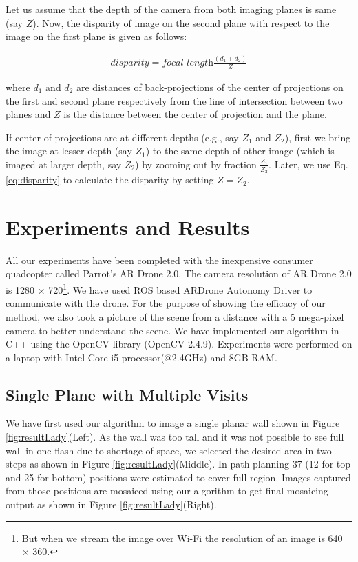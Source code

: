 Let us assume that the depth of the camera from both imaging planes is same
(say $Z$). Now, the disparity of image on the second plane with respect to the
image on the first plane is given as follows\cite{Prasad16}:
\begin{ceqn}
\begin{align}
\textit{disparity} = \textit{focal length}\frac{(d_1+d_2)}{Z}
\label{eq:disparity}
\end{align}
\end{ceqn}

where $d_1$ and $d_2$ are distances of back-projections of the center of
projections on the first and second plane respectively from the line of
intersection between two planes and $Z$ is the distance between the center of
projection and the plane.

If center of projections are at different depths (e.g., say $Z_1$ and
$Z_2$), first we bring the image at lesser depth (say $Z_1$) to the same depth
of other image (which is imaged at larger depth, say $Z_2$) by zooming out by
fraction $\frac{Z_1}{Z_2}$. Later, we use Eq. \ref{eq:disparity} to calculate
the disparity by setting $Z=Z_2$.

\section{Experiments and Results}
All our experiments have been completed with the inexpensive consumer
quadcopter called  Parrot’s AR Drone 2.0. The camera resolution of AR Drone 2.0
is 1280 $\times$ 720\footnote{But when we stream the image over Wi-Fi the resolution
of an image is 640 $\times$ 360.}. We have used ROS based ARDrone Autonomy
Driver to communicate with the drone. For the purpose of showing the efficacy
of our method, we also took a picture of the scene from a distance with a 5
mega-pixel camera to better understand the scene. We have implemented our
algorithm in C++ using the OpenCV library (OpenCV 2.4.9).  Experiments were
performed on a laptop with Intel Core i5 processor(@2.4GHz) and 8GB RAM.

\subsection{Single Plane with Multiple Visits}
We have first used our algorithm to image a single planar wall shown in
Figure \ref{fig:resultLady}(Left). As the wall was too tall and it was not
possible to see full wall in one flash due to shortage of space, we selected the
desired area in two steps as shown in Figure  \ref{fig:resultLady}(Middle). In path planning 37 (12
for top and 25 for bottom) positions were estimated to cover full region. Images
captured from those positions are mosaiced using our algorithm to get final
mosaicing output as shown in Figure \ref{fig:resultLady}(Right).

